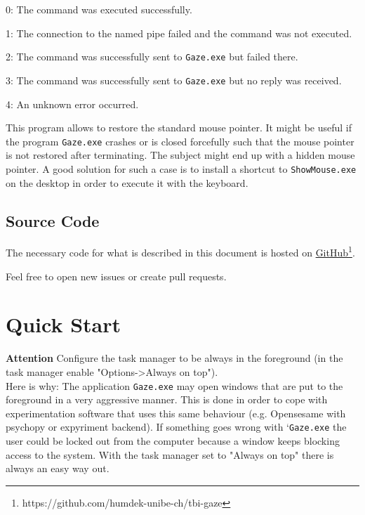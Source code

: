 \documentclass[a4paper,oneside]{book}
\begin{document}
\begin{description}
        \begin{description}
            \item{0:} The command was executed successfully.
            \item{1:} The connection to the named pipe failed and the command was not executed.
            \item{2:} The command was successfully sent to \texttt{Gaze.exe} but failed there.
            \item{3:} The command was successfully sent to \texttt{Gaze.exe} but no reply was received.
            \item{4:} An unknown error occurred.
        \end{description}
    \item[ShowMouse.exe] This program allows to restore the standard mouse pointer.
        It might be useful if the program \texttt{Gaze.exe} crashes or is closed forcefully such that the mouse pointer is not restored after terminating.
        The subject might end up with a hidden mouse pointer.
        A good solution for such a case is to install a shortcut to \texttt{ShowMouse.exe} on the desktop in order to execute it with the keyboard.
\end{description}

\section{Source Code}
\label{sec.gitlab}
The necessary code for what is described in this document is hosted on \href{https://github.com/humdek-unibe-ch/tbi-gaze}{GitHub}\footnote{https://github.com/humdek-unibe-ch/tbi-gaze}.

Feel free to open new issues or create pull requests.

\chapter{Quick Start}
\label{sec.quick}

\begin{mdframed}[backgroundcolor=boxbkg]\textbf{\color{red}Attention}
    Configure the task manager to be always in the foreground (in the task manager enable "Options->Always on top").\\
    Here is why: The application \texttt{Gaze.exe} may open windows that are put to the foreground in a very aggressive manner.
    This is done in order to cope with experimentation software that uses this same behaviour (e.g. Opensesame with psychopy or expyriment backend).
    If something goes wrong with `\texttt{Gaze.exe} the user could be locked out from the computer because a window keeps blocking access to the system.
    With the task manager set to "Always on top" there is always an easy way out.
\end{mdframed}
\end{document}
